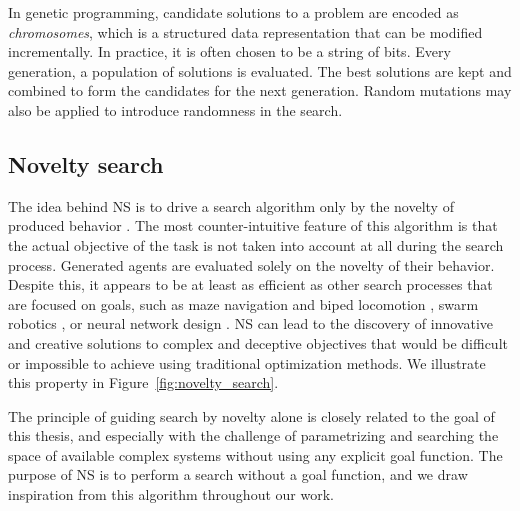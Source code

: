 In genetic programming, candidate solutions to a problem are encoded as
\emph{chromosomes}, which is a structured data representation that can be
modified incrementally. In practice, it is often chosen to be a string of bits.
Every generation, a population of solutions is evaluated. The best solutions are
kept and combined to form the candidates for the next generation. Random
mutations may also be applied to introduce randomness in the search.

\subsection{Novelty search}
The idea behind \ac{NS} is to drive a search algorithm only by the novelty of
produced behavior \parencite{lehmanAbandoningObjectivesEvolution2011}. The most
counter-intuitive feature of this algorithm is that the actual objective of the
task is not taken into account at all during the search process. Generated
agents are evaluated solely on the novelty of their behavior. Despite this, it
appears to be at least as efficient as other search processes that are focused on goals, such as maze navigation and biped locomotion
\parencite{lehmanAbandoningObjectivesEvolution2011}, swarm robotics
\parencite{gomesEvolutionSwarmRobotics2013}, or neural network design
\parencite{risiEvolvingPlasticNeural2010}. \ac{NS} can lead to the discovery 
of innovative and creative solutions to complex and deceptive objectives that 
would be difficult or impossible to achieve using traditional optimization methods. 
We illustrate this property in Figure~\ref{fig:novelty_search}.

The principle of guiding search by novelty alone is closely related to the goal
of this thesis, and especially with the challenge of parametrizing and searching
the space of available complex systems without using any explicit goal function.
The purpose of \ac{NS} is to perform a search without a goal function, and we draw
inspiration from this algorithm throughout our work.

